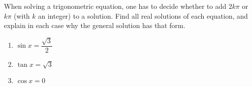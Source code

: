 When solving a trigonometric equation, one has to decide whether to add $2k\pi$ or $k\pi$ (with $k$ an integer) to a solution. Find all real solutions of each equation, and explain in each case why the general solution has that form.
\begin{enumerate}
\item[(a)] $\sin x=\dfrac{\sqrt3}{2}$
\item[(b)] $\tan x=\sqrt3$
\item[(c)] $\cos x=0$
\end{enumerate}

